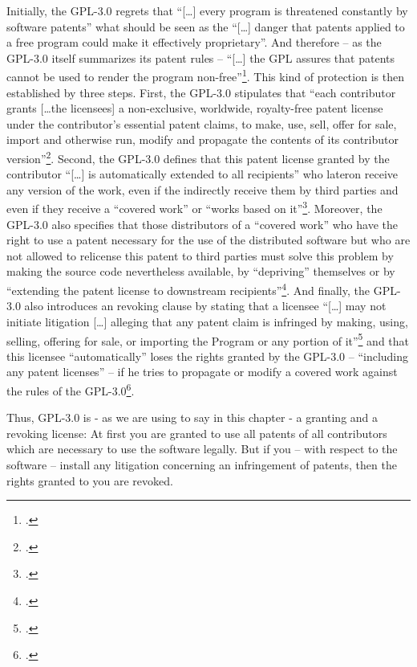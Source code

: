 Initially, the GPL-3.0 regrets that \enquote{[\ldots] every program is
threatened constantly by software patents} what should be seen as the
\enquote{[\ldots] danger that patents applied to a free program could make it
effectively proprietary}. And therefore -- as the GPL-3.0 itself summarizes its
patent rules -- \enquote{[\ldots] the GPL assures that patents cannot be used to
render the program non-free}\footcite[cf.][\nopage wp.\
Preamble]{Gpl30OsiLicense2007a}. This kind of protection is then established by
three steps. First, the GPL-3.0 stipulates that \enquote{each contributor grants
[\ldots the licensees] a non-exclusive, worldwide, royalty-free patent license
under the contributor's essential patent claims, to make, use, sell, offer for
sale, import and otherwise run, modify and propagate the contents of its
contributor version}\footcite[cf.][\nopage wp.\ §11]{Gpl30OsiLicense2007a}.
Second, the GPL-3.0 defines that this patent license granted by the contributor
\enquote{[\ldots] is automatically extended to all recipients} who lateron
receive any version of the work, even if the indirectly receive them by third
parties and even if they receive a \enquote{covered work} or \enquote{works
based on it}\footcite[cf.][\nopage wp.\ §11]{Gpl30OsiLicense2007a}. Moreover,
the GPL-3.0 also specifies that those distributors of a \enquote{covered work}
who have the right to use a patent necessary for the use of the distributed
software but who are not allowed to relicense this patent to third parties must
solve this problem by making the source code nevertheless available, by
\enquote{depriving} themselves or by \enquote{extending the patent license to
downstream recipients}\footcite[cf.][\nopage wp.\ §11]{Gpl30OsiLicense2007a}.
And finally, the GPL-3.0 also introduces an revoking clause by stating that a
licensee \enquote{[\ldots] may not initiate litigation [\ldots] alleging that
any patent claim is infringed by making, using, selling, offering for sale, or
importing the Program or any portion of it}\footcite[cf.][\nopage wp.\
§10]{Gpl30OsiLicense2007a} and that this licensee \enquote{automatically} loses
the rights granted by the GPL-3.0 -- \enquote{including any patent licenses} --
if he tries to propagate or modify a covered work against the rules of the
GPL-3.0\footcite[cf.][\nopage wp.\ §8]{Gpl30OsiLicense2007a}.

Thus, GPL-3.0 is - as we are using to say in this chapter - a granting and a
revoking license: At first you are granted to use all patents of all
contributors which are necessary to use the software legally. But if you -- with
respect to the software -- install any litigation concerning an infringement of
patents, then the rights granted to you are revoked.


